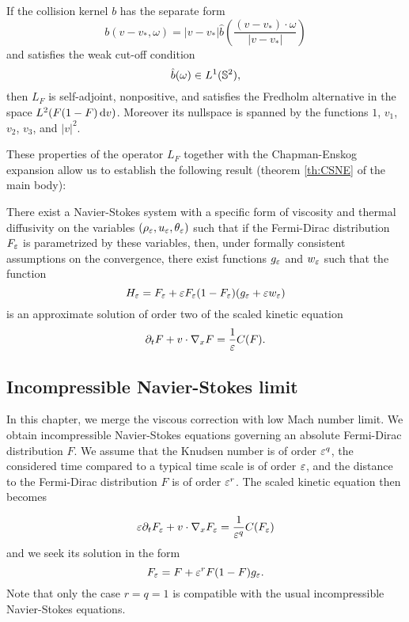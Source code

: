 \begin{theorem*}
	If the collision kernel $b$ has the separate form \[b(v-v_*,\omega) = |v-v_*| \hat b\left(\frac{(v-v_*)\cdot \omega}{|v-v_*|}\right)\]
	 and satisfies the weak cut-off condition 
	 \[\hat b (\omega)\in L^1 ({\mathbb {S}^2}) ,\]
	  then $L_F$ is self-adjoint, nonpositive, and satisfies the Fredholm alternative in the space $L^2(F(1-F){\,\mathrm{d} v})$. Moreover its nullspace is spanned by the functions $1$, $v_1$, $v_2$, $v_3$, and $|v|^2$.
\end{theorem*}
These properties of the operator $L_F$ together with   the Chapman-Enskog expansion allow us to establish the following result (theorem \ref{th:CSNE} of the main body):
\begin{theorem*}
	There exist a Navier-Stokes system with a specific form of viscosity and thermal diffusivity on the variables $(\rho_{\varepsilon}, u_{\varepsilon}, \theta_{\varepsilon})$ such that if the Fermi-Dirac distribution $F_{\varepsilon}$ is parametrized by these variables, then, under formally consistent assumptions on the convergence, there exist functions $g_{\varepsilon}$ and $w_{\varepsilon}$ such that the function \[H_{\varepsilon} = F_{\varepsilon}+ {\varepsilon} F_{\varepsilon}(1-F_{\varepsilon})(g_{\varepsilon} +{\varepsilon} w_{\varepsilon})\] is an approximate solution of order two of the scaled kinetic equation
\begin{equation*}
	\partial_t F+ v\cdot \nabla_x F=\frac{1}{{\varepsilon}}C(F).
\end{equation*}

\end{theorem*}



\subsection{Incompressible Navier-Stokes limit} %
\label{sub:incompressible_navier_stokes_limit}

In this chapter, we merge the viscous correction with low Mach number limit. We obtain incompressible Navier-Stokes equations governing an absolute Fermi-Dirac distribution $F$. We assume that the Knudsen number is of order ${\varepsilon}^q$, the considered time compared to a typical time scale is of order ${\varepsilon}$, and the distance to the Fermi-Dirac distribution $F$ is of order ${\varepsilon}^r$. The scaled kinetic equation then becomes

\begin{equation}\label{eq:i:inc}
	{\varepsilon}\partial_t F_{\varepsilon}+ v\cdot \nabla_x F_{\varepsilon}=\frac{1}{{\varepsilon}^q}C(F_{\varepsilon})
\end{equation}
and we seek its solution in the form
\[
F_{\varepsilon}=F+ {\varepsilon}^r F (1-F ) g_{\varepsilon}.
\]
Note that only the case $r=q=1$ is compatible with the usual incompressible Navier-Stokes equations.%

